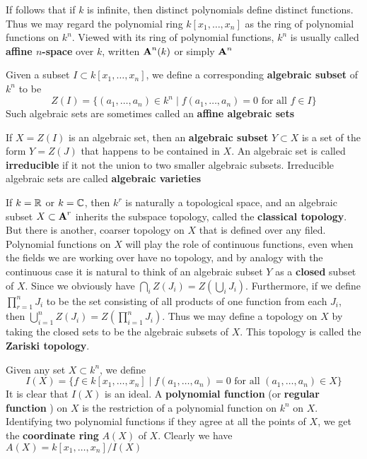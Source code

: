 \documentclass[11pt]{article}
\begin{document}
If follows that if \(k\) is infinite, then distinct polynomials define
distinct functions. Thus we may regard the polynomial ring
\(k[x_1,\dots,x_n]\) as the ring of polynomial functions on \(k^n\).  Viewed
with its ring of polynomial functions, \(k^n\) is usually called \textbf{affine
\(n\)-space} over \(k\), written \(\operatorname{\textbf{A}}^n(k)\) or simply \(\operatorname{\textbf{A}}^n\)

Given a subset \(I\subset k[x_1,\dots,x_n]\), we define a corresponding
\textbf{algebraic subset} of \(k^n\) to be
\begin{equation*}
Z(I)=\{(a_1,\dots,a_n)\in k^n\mid f(a_1,\dots,a_n)=0\text{ for all }f\in I\}
\end{equation*}
Such algebraic sets are sometimes called an \textbf{affine algebraic sets}

If \(X=Z(I)\) is an algebraic set, then an \textbf{algebraic subset} \(Y\subset X\) is
a set of the form \(Y=Z(J)\) that happens to be contained in \(X\). An
algebraic set is called \textbf{irreducible} if it not the union to two smaller
algebraic subsets. Irreducible algebraic sets are called \textbf{algebraic varieties}

If \(k=\mathbb{R}\) or \(k=\mathbb{C}\), then \(k^r\) is naturally a topological space, and
an algebraic subset \(X\subset\operatorname{\textbf{A}}^r\) inherits the subspace topology, called
the \textbf{classical topology}. But there is another, coarser topology on \(X\) that
is defined over any filed. Polynomial functions on \(X\) will play the role
of continuous functions, even when the fields we are working over have no
topology, and by analogy with the continuous case it is natural to think of
an algebraic subset \(Y\) as a \textbf{closed} subset of \(X\). Since we  obviously
have \(\bigcap_iZ(J_i)=Z(\bigcup_iJ_i)\). Furthermore, if we define
\(\prod_{r=1}^nJ_i\) to be the set consisting of all products of one function
from each \(J_i\), then \(\bigcup_{i=1}^nZ(J_i)=Z(\prod_{i=1}^nJ_i)\). Thus
we may define a topology on \(X\) by taking the closed sets to be the
algebraic subsets of \(X\). This topology is called the \textbf{Zariski topology}.

Given any set \(X\subset k^n\), we define
\begin{equation*}
I(X)=\{f\in k[x_1,\dots,x_n]\mid f(a_1,\dots,a_n)=0\text{ for all }(a_1,\dots,a_n)\in X\}
\end{equation*}
It is clear that \(I(X)\) is an ideal. A \textbf{polynomial function} (or \textbf{regular
function} ) on \(X\) is the restriction of a polynomial function on \(k^n\) on
\(X\). Identifying two polynomial functions if they agree at all the points
of \(X\), we get the \textbf{coordinate ring} \(A(X)\) of \(X\). Clearly we have
\(A(X)=k[x_1,\dots,x_n]/I(X)\)
\end{document}
